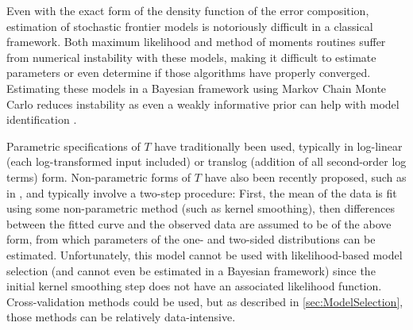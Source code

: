 \documentclass[twocolumn]{article}
\begin{document}
Even with the exact form of the density function of the error composition, estimation of stochastic frontier models is notoriously difficult in a classical framework. Both maximum likelihood and method of moments routines suffer from numerical instability with these models, making it difficult to estimate parameters or even determine if those algorithms have properly converged. Estimating these models in a Bayesian framework using Markov Chain Monte Carlo reduces instability as even a weakly informative prior can help with model identification \citep{VanDenBroeck}.

Parametric specifications of $T$ have traditionally been used, typically in log-linear (each log-transformed input included) or translog (addition of all second-order log terms) form. Non-parametric forms of $T$ have also been recently proposed, such as in \cite{ParmeterRacine}, and typically involve a two-step procedure: First, the mean of the data is fit using some non-parametric method (such as kernel smoothing), then differences between the fitted curve and the observed data are assumed to be of the above form, from which parameters of the one- and two-sided distributions can be estimated. Unfortunately, this model cannot be used with likelihood-based model selection (and cannot even be estimated in a Bayesian framework) since the initial kernel smoothing step does not have an associated likelihood function. Cross-validation methods could be used, but as described in \cref{sec:ModelSelection}, those methods can be relatively data-intensive.


\end{document}
